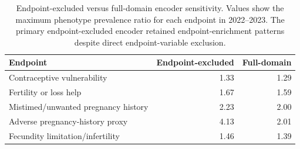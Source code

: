 \begin{table}[H]
\centering
\caption{Endpoint-excluded versus full-domain encoder sensitivity. Values show the maximum phenotype prevalence ratio for each endpoint in 2022--2023. The primary endpoint-excluded encoder retained endpoint-enrichment patterns despite direct endpoint-variable exclusion.}
\label{tab:leakage_sensitivity}
\scriptsize
\setlength{\tabcolsep}{4pt}
\begin{tabular*}{\textwidth}{@{\extracolsep{\fill}}lrr@{}}
\toprule
Endpoint & Endpoint-excluded & Full-domain \\
\midrule
Contraceptive vulnerability & 1.33 & 1.29 \\
Fertility or loss help & 1.67 & 1.59 \\
Mistimed/unwanted pregnancy history & 2.23 & 2.00 \\
Adverse pregnancy-history proxy & 4.13 & 2.01 \\
Fecundity limitation/infertility & 1.46 & 1.39 \\
\bottomrule
\end{tabular*}
\end{table}
